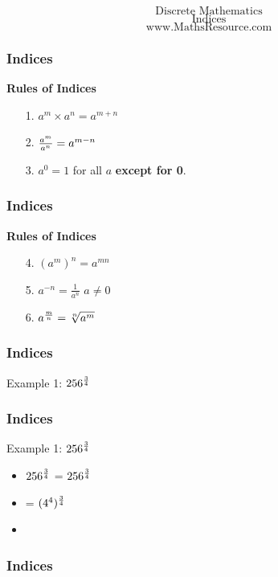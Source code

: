 \documentclass{beamer}
\begin{document}
\begin{frame}
{
\huge
\[ \mbox{Discrete Mathematics} \]
\[ \mbox{Indices} \]
}
{
\Large
\[ \mbox{www.MathsResource.com} \]
}
\end{frame}
\begin{frame}
\frametitle{Indices}
\LARGE
\vspace{-1cm}
\textbf{Rules of Indices}
\begin{enumerate}
\item[1.] $a^m\times a^n=a^{m+n}$ \bigskip  \vspace{1.5cm}
\item[2.] ${a^m\over a^n} =  a^{m-n}$ \bigskip \vspace{1.5cm}
\item[3.] $a^0 = 1$ for all $a$ \textbf{except for 0}.
\end{enumerate}
\end{frame}
\begin{frame}
\frametitle{Indices}
\LARGE
\vspace{-1cm}
\textbf{Rules of Indices}
\begin{enumerate}
\item[4.] $(a^m)^n=a^{mn}$ \bigskip \vspace{1.5cm}
\item[5.] $a^{-n} = \frac{1}{a^n}$ $a \neq 0 $ \bigskip \vspace{1.5cm}
\item[6.] $a^{{m \over n}} = \sqrt[n]{a^m}$
\end{enumerate}
\end{frame}
\begin{frame}
\frametitle{Indices}
\Large
\vspace{-3cm}
Example 1: $256^{3\over 4}$


\end{frame}
\begin{frame}
\frametitle{Indices}
\Large
Example 1: $256^{3\over 4}$

\begin{itemize}
\item $256^{3\over 4}$ = 
$256^{3\over 4}$ 
\item {} = $(4^4)^{3\over 4}$
\item 
\end{itemize}

\end{frame}
\begin{frame}
\frametitle{Indices}
\end{frame}
\end{document}

